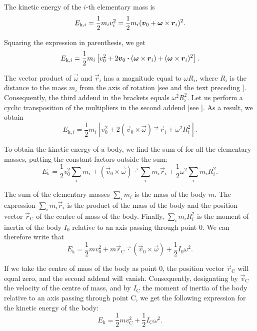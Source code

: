 The kinetic energy of the $i$-th elementary mass is
\begin{equation*}
	E_{\text{k},i} = \frac{1}{2}m_i v_i^2 = \frac{1}{2}m_i (\boldsymbol{v}_0 + \boldsymbol{\omega}\times\boldsymbol{r}_i)^2.
\end{equation*}

\noindent
Squaring the expression in parenthesis, we get
\begin{equation*}
	E_{\text{k},i} = \frac{1}{2}m_i \left[v_0^2 + 2\boldsymbol{v}_0\boldsymbol{\cdot}(\boldsymbol{\omega}\times\boldsymbol{r}_i) + (\boldsymbol{\omega}\times\boldsymbol{r}_i)^2\right].
\end{equation*}

\noindent
The vector product of $\vec{\omega}$ and $\vec{r}_i$ has a magnitude equal to $\omega R_i$, where $R_i$ is the distance to the mass $m_i$ from the axis of rotation [see  and the text preceding ]. Consequently, the third addend in the brackets equals $\omega^2R_i^2$. Let us perform a cyclic transposition of the multipliers in the second addend [see ]. As a result, we obtain
\begin{equation}\label{eq:5_53}
	E_{\text{k},i} = \frac{1}{2}m_i \left[v_0^2 + 2(\vec{v}_0\times\vec{\omega})\vec{\cdot}\vec{r}_i + \omega^2 R_i^2\right].
\end{equation}

To obtain the kinetic energy of a body, we find the sum of  for all the elementary masses, putting the constant factors outside the sum:
\begin{equation*}
	E_{\text{k}} = \frac{1}{2} v_0^2 \sum_i m_i + (\vec{v}_0\times\vec{\omega})\vec{\cdot}\sum_i m_i\vec{r}_i + \frac{1}{2}\omega^2 \sum_i m_iR_i^2.
\end{equation*}

\noindent
The sum of the elementary masses $\sum_i m_i$ is the mass of the body $m$. The expression $\sum_i m_i\vec{r}_i$ is the product of the mass of the body and the position vector $\vec{r}_{\text{C}}$ of the centre of mass of the body. Finally, $\sum_i m_iR_i^2$ is the moment of inertia of the body $I_0$ relative to an axis passing through point $0$. We can therefore write that
\begin{equation}\label{eq:5_54}
	E_{\text{k}} = \frac{1}{2} mv_0^2 + m\vec{r}_{\text{C}}\vec{\cdot}(\vec{v}_0\times\vec{\omega}) + \frac{1}{2} I_0\omega^2.
\end{equation}

If we take the centre of mass of the body as point $0$, the position vector $\vec{r}_{\text{C}}$ will equal zero, and the second addend will vanish. Consequently, designating by $\vec{v}_{\text{C}}$ the velocity of the centre of mass, and by $I_{\text{C}}$ the moment of inertia of the body relative to an axis passing through point C, we get the following expression for the kinetic energy of the body:
\begin{equation}\label{eq:5_55}
	E_{\text{k}} = \frac{1}{2}m v_{\text{C}}^2 + \frac{1}{2} I_{\text{C}} \omega^2.
\end{equation}

